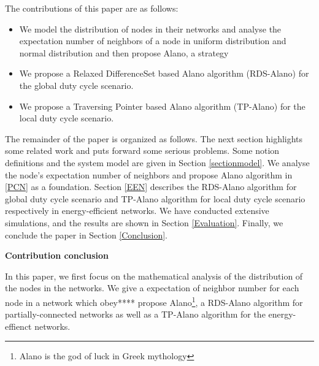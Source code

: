 

The contributions of this paper are as follows:
\begin{itemize}
\item[1)] We model the distribution of nodes in their networks and analyse the 
expectation number of neighbors of a node in uniform distribution and normal
distribution and then propose Alano, a strategy
\item[2)] We propose a Relaxed DifferenceSet based Alano algorithm (RDS-Alano) 
for the global duty cycle scenario. 
\item[3)] We propose a Traversing Pointer based Alano algorithm (TP-Alano) 
for the local duty cycle scenario. 
\end{itemize}




The remainder of the paper is organized as follows.
The next section highlights some related work and 
puts forward some serious problems. 
Some notion definitions and the system model are given in Section
\ref{sectionmodel}. 
We analyse the node's expectation number of neighbors and 
propose Alano algorithm in \ref{PCN} as a foundation.
Section \ref{EEN} describes the RDS-Alano algorithm for global
duty cycle scenario and TP-Alano algorithm for local duty cycle scenario
respectively in energy-efficient networks.
We have conducted extensive simulations, and the results are shown in Section
\ref{Evaluation}. Finally, we conclude the paper in Section
\ref{Conclusion}.













\textbf{Contribution conclusion}

In this paper, we first focus on the mathematical analysis of the distribution of the nodes in the networks.
We give a expectation of neighbor number for each node in a network which obey****
  propose Alano\footnote{Alano is the god of luck in Greek mythology }, 
a RDS-Alano algorithm for partially-connected networks 
as well as a TP-Alano algorithm for the energy-effienct networks.










